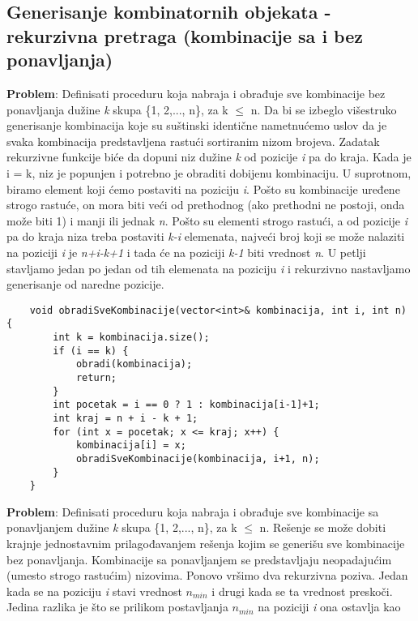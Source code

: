 \documentclass{article}
\begin{document}
\subsection{Generisanje kombinatornih objekata - rekurzivna pretraga (kombinacije sa i bez ponavljanja)}
\textbf{Problem}: Definisati proceduru koja nabraja i obrađuje sve kombinacije bez
ponavljanja dužine \textit{k} skupa \{1, 2,..., n\}, za k $\leq$ n.
\newline
Da bi se izbeglo višestruko generisanje kombinacija koje su suštinski identične
nametnućemo uslov da je svaka kombinacija predstavljena rastući sortiranim
nizom brojeva. Zadatak rekurzivne funkcije biće
da dopuni niz dužine \textit{k} od pozicije \textit{i} pa do kraja. Kada je i = k, niz je popunjen
i potrebno je obraditi dobijenu kombinaciju. U suprotnom, biramo element koji
ćemo postaviti na poziciju \textit{i}. Pošto su kombinacije uređene strogo rastuće, on
mora biti veći od prethodnog (ako prethodni ne postoji, onda može biti 1) i
manji ili jednak \textit{n}. Pošto
su elementi strogo rastući, a od pozicije \textit{i} pa do kraja niza treba postaviti \textit{k-i}
elemenata, najveći broj koji se može nalaziti na poziciji \textit{i} je 
\textit{n+i-k+1} i tada
će na poziciji \textit{k-1} biti vrednost \textit{n}. U petlji stavljamo jedan po jedan od tih
elemenata na poziciju \textit{i} i rekurzivno nastavljamo generisanje od naredne pozicije.
\begin{lstlisting}
    void obradiSveKombinacije(vector<int>& kombinacija, int i, int n) {
        int k = kombinacija.size();
        if (i == k) {
            obradi(kombinacija);
            return;
        }
        int pocetak = i == 0 ? 1 : kombinacija[i-1]+1;
        int kraj = n + i - k + 1;
        for (int x = pocetak; x <= kraj; x++) {
            kombinacija[i] = x;
            obradiSveKombinacije(kombinacija, i+1, n);
        }   
    }
\end{lstlisting}
\textbf{Problem}: Definisati proceduru koja nabraja i obrađuje sve kombinacije sa
ponavljanjem dužine \textit{k} skupa \{1, 2,..., n\}, za k $\leq$ n. 
\newline
Rešenje se može dobiti krajnje jednostavnim prilagođavanjem rešenja kojim
se generišu sve kombinacije bez ponavljanja. Kombinacije sa ponavljanjem se
predstavljaju neopadajućim (umesto strogo rastućim) nizovima. Ponovo vršimo dva rekurzivna poziva. Jedan
kada se na poziciju \textit{i} stavi vrednost $n_{min}$ i drugi kada se ta vrednost preskoči.
Jedina razlika je što se prilikom postavljanja $n_{min}$ na poziciji \textit{i} ona ostavlja kao
\end{document}
